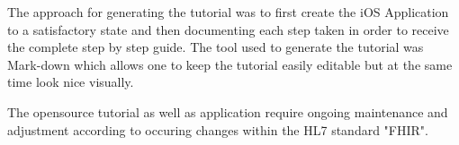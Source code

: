 \documentclass{article}
\begin{document}
The approach for generating the tutorial was to first create the iOS Application to a satisfactory state and then documenting each step taken in order to receive the complete step by step guide. The tool used to generate the tutorial was Mark-down which allows one to keep the tutorial easily editable but at the same time look nice visually.

The opensource tutorial as well as application require ongoing maintenance and adjustment according to occuring changes within the HL7 standard "FHIR".



\end{document}
